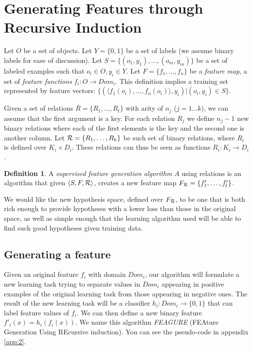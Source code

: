 \documentclass[twoside,11pt]{article}
\theoremstyle{definition}
\newtheorem{defn}{Definition}[section]
\begin{document}
\section{Generating Features through Recursive Induction}

Let $O$ be a set of objects. Let $Y=\{0,1\}$ be a set of labels (we assume binary labels for ease of discussion). Let $S=\{(o_{1},y_{1}),\ldots,(o_{m},y_{m})\}$ be a set of labeled examples such that $o_{i}\in O, y_{i}\in Y$. Let $F=\{f_{1},\ldots,f_{n}\}$ be a \emph{feature map}, a set of \emph{feature functions} $f_{i}:O\rightarrow Dom_{i}$.  This definition implies a training set represented by feature vectors: $\{ (\langle f_1(o_i),\ldots,f_n(o_i)\rangle, y_i) | (o_i,y_i) \in S\}$.

Given a set of relations $\bar{R}=\{R_{1},\ldots,R_{t}\}$ with arity of $n_{j}$ ($j=1\ldots k$), we can assume  that the first argument is a key. For each relation $R_{j}$ we define $n_{j}-1$ new binary relations where each of the first elements is the key and the second one is another column.
Let ${\cal R}=\{R_{1},\ldots,R_{k}\}$ be such set of binary relations, where $R_{i}$ is defined over $K_{i}\times D_{i}$. These relations can thus be seen as functions $R_{i}: K_{i}\rightarrow D_{i}$.

\begin{defn}
	A \emph{supervised feature generation algorithm} $A$ using relations is an algorithm that given $\langle S,F,{\cal R} \rangle$, creates a new feature map $F_{\cal R}=\{f'_{1},\ldots,f'_{l}\}$.
\end{defn}

We would like the new hypothesis space, defined over $F_{\cal R}$, to be one that is both rich enough to provide hypotheses with a lower loss than those in the original space, as well as simple enough that the learning algorithm used will be able to find such good hypotheses given training data.

\subsection{Generating a feature} \label{algorithm_section}

Given an original feature $f_{i}$ with domain $Dom_i$, our algorithm will formulate a new learning task trying to separate values in $Dom_i$ appearing in positive examples of the original learning task from those appearing in negative ones.  The result of the new learning task will be a classifier
$h_{i}:Dom_{i}\rightarrow \{0,1\}$ that can label feature values of $f_{i}$. We can then define a new binary feature $f'_{i}(x)=h_{i}(f_{i}(x))$.
We name this algorithm \emph{FEAGURE} (FEAture Generation Using REcursive induction). You can see the pseudo-code in appendix \ref{app:2}.
\end{document}
